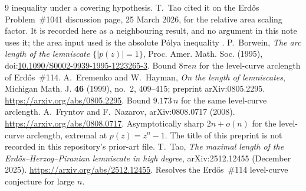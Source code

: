 \documentclass[11pt]{article}
\begin{document}
\begin{thebibliography}{9}
  inequality under a covering hypothesis.  T.~Tao cited it on the Erd\H{o}s
  Problem~\#1041 discussion page, 25 March 2026, for the relative area
  scaling factor.  It is recorded here as a neighbouring result, and no
  argument in this note uses it; the area input used is the absolute
  P\'olya inequality \cite{polya1928}.
 P.~Borwein,
  \emph{The arc length of the lemniscate $\{|p(z)|=1\}$},
  Proc. Amer. Math. Soc. (1995),
  doi:\href{https://doi.org/10.1090/S0002-9939-1995-1223265-3}
  {10.1090/S0002-9939-1995-1223265-3}.
  Bound $8\pi en$ for the level-curve arclength of Erd\H{o}s~\#114.
 A.~Eremenko and W.~Hayman,
  \emph{On the length of lemniscates},
  Michigan Math. J. \textbf{46} (1999), no.~2, 409--415; preprint
  arXiv:0805.2295. \url{https://arxiv.org/abs/0805.2295}.
  Bound $9.173\,n$ for the same level-curve arclength.
 A.~Fryntov and F.~Nazarov,
  arXiv:0808.0717 (2008).
  \url{https://arxiv.org/abs/0808.0717}.
  Asymptotically sharp $2n+o(n)$ for the level-curve arclength, extremal at
  $p(z)=z^n-1$.  The title of this preprint is not recorded in this
  repository's prior-art file.
 T.~Tao,
  \emph{The maximal length of the Erd\H{o}s--Herzog--Piranian lemniscate in
  high degree}, arXiv:2512.12455 (December 2025).
  \url{https://arxiv.org/abs/2512.12455}.
  Resolves the Erd\H{o}s~\#114 level-curve conjecture for large $n$.
\end{thebibliography}
\end{document}
